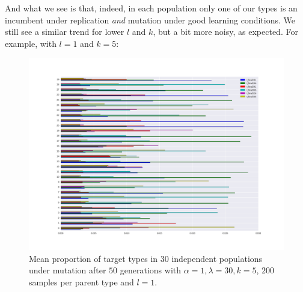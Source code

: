 \documentclass[a4paper]{article}
\begin{document}
And what we see is that, indeed, in each population only one of our types is an incumbent under replication {\em and} mutation under good learning conditions. We still see a similar trend for lower $l$ and $k$, but a bit more noisy, as expected. For example, with $l = 1$ and $k = 5$:


\begin{figure}[h!]
  \centering
    \includegraphics[scale=0.4]{../code-LOT-extension/plots/rm-lam30-a1-k5-s200-l1-meFalse432-nomean.png}
  \caption{Mean proportion of target types in $30$ independent populations under mutation after $50$ generations with $\alpha = 1, \lambda = 30, k = 5$, $200$ samples per parent type and $l = 1$.}
\end{figure}




\end{document}
